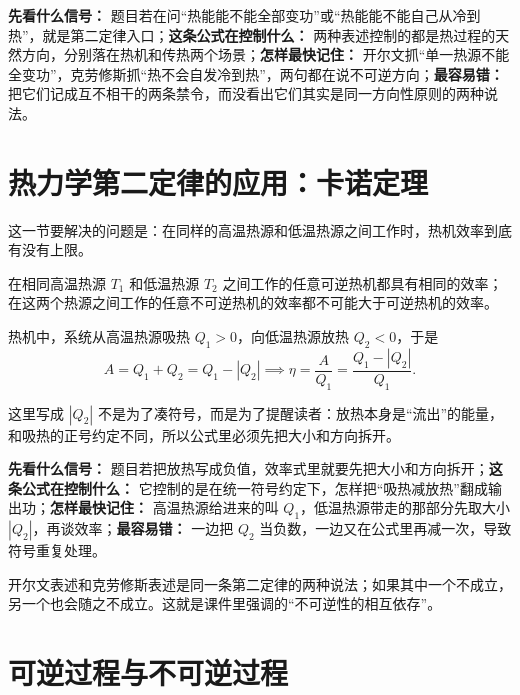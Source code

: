 \documentclass[lang=cn,11pt]{elegantbook}
\newcommand{\bridge}[1]{\begin{note}#1\end{note}}
\begin{document}
\begin{note}
\textbf{先看什么信号：} 题目若在问“热能能不能全部变功”或“热能能不能自己从冷到热”，就是第二定律入口；\textbf{这条公式在控制什么：} 两种表述控制的都是热过程的天然方向，分别落在热机和传热两个场景；\textbf{怎样最快记住：} 开尔文抓“单一热源不能全变功”，克劳修斯抓“热不会自发冷到热”，两句都在说不可逆方向；\textbf{最容易错：} 把它们记成互不相干的两条禁令，而没看出它们其实是同一方向性原则的两种说法。
\end{note}

\section{热力学第二定律的应用：卡诺定理}

这一节要解决的问题是：在同样的高温热源和低温热源之间工作时，热机效率到底有没有上限。

\begin{theorem}[卡诺定理]
在相同高温热源 \(T_1\) 和低温热源 \(T_2\) 之间工作的任意可逆热机都具有相同的效率；在这两个热源之间工作的任意不可逆热机的效率都不可能大于可逆热机的效率。
\end{theorem}

热机中，系统从高温热源吸热 \(Q_1>0\)，向低温热源放热 \(Q_2<0\)，于是
\[
A=Q_1+Q_2=Q_1-|Q_2|
\implies
\eta=\frac{A}{Q_1}=\frac{Q_1-|Q_2|}{Q_1}.
\]

\bridge{这里写成 \(|Q_2|\) 不是为了凑符号，而是为了提醒读者：放热本身是“流出”的能量，和吸热的正号约定不同，所以公式里必须先把大小和方向拆开。}

\begin{note}
\textbf{先看什么信号：} 题目若把放热写成负值，效率式里就要先把大小和方向拆开；\textbf{这条公式在控制什么：} 它控制的是在统一符号约定下，怎样把“吸热减放热”翻成输出功；\textbf{怎样最快记住：} 高温热源给进来的叫 \(Q_1\)，低温热源带走的那部分先取大小 \(|Q_2|\)，再谈效率；\textbf{最容易错：} 一边把 \(Q_2\) 当负数，一边又在公式里再减一次，导致符号重复处理。
\end{note}

\begin{remark}
开尔文表述和克劳修斯表述是同一条第二定律的两种说法；如果其中一个不成立，另一个也会随之不成立。这就是课件里强调的“不可逆性的相互依存”。
\end{remark}

\section{可逆过程与不可逆过程}
\end{document}
